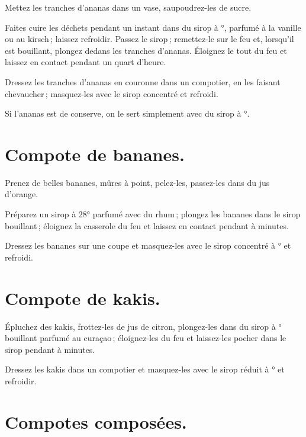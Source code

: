 Mettez les tranches d'ananas dans un vase, saupoudrez-les de sucre.

Faites cuire les déchets pendant un instant dans du sirop à {\mmm}°,
parfumé à la vanille ou au kirsch ; laissez refroidir. Passez le sirop ;
remettez-le sur le feu et, lorsqu'il est bouillant, plongez dedans les tranches
d'ananas. Éloignez le tout du feu et laissez en contact pendant un quart
d'heure.

Dressez les tranches d’ananas en couronne dans un compotier, en les faisant
chevaucher ; masquez-les avec le sirop concentré et refroidi.

\sk

Si l'ananas est de conserve, on le sert simplement avec du sirop à {\mmm}°.

\section*{\centering Compote de bananes.}
{}

Prenez de belles bananes, mûres à point, pelez-les, passez-les dans du jus
d'orange.

Préparez un sirop à 28° parfumé avec du rhum ; plongez les bananes
dans le sirop bouillant ; éloignez la casserole du feu et laissez en contact
pendant {\mmm} à {\mmm} minutes.

Dressez les bananes sur une coupe et masquez-les avec le sirop concentré
à {\mmm}° et refroidi.

\section*{\centering Compote de kakis.}
{}

Épluchez des kakis, frottez-les de jus de citron, plongez-les dans du sirop
à {\mmm}° bouillant parfumé au curaçao ; éloignez-les du feu et
laissez-les pocher dans le sirop pendant {\mmm} à {\mmm} minutes.

Dressez les kakis dans un compotier et masquez-les avec le sirop réduit
à {\mmm}° et refroidir.

\section*{\centering Compotes composées.}
{}

